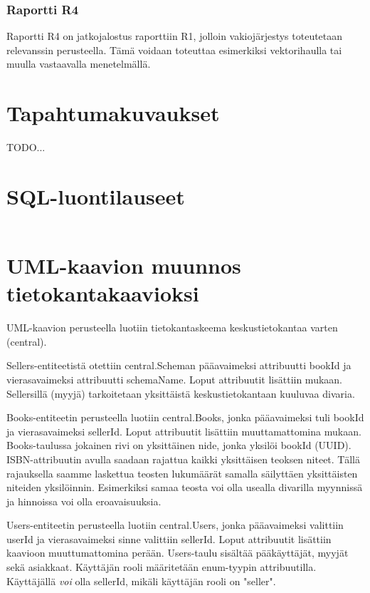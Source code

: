 \documentclass[11pt,a4paper]{article}
\begin{document}
\subsubsection{Raportti R4}

Raportti R4 on jatkojalostus raporttiin R1, jolloin vakiojärjestys toteutetaan relevanssin perusteella. Tämä voidaan toteuttaa esimerkiksi vektorihaulla tai muulla vastaavalla menetelmällä.

\section{Tapahtumakuvaukset}

TODO...

\section{SQL-luontilauseet}
\inputminted{sql}{assets/create.sql}

\section{UML-kaavion muunnos tietokantakaavioksi}

UML-kaavion perusteella luotiin tietokantaskeema keskustietokantaa varten (central).

Sellers-entiteetistä otettiin central.Scheman pääavaimeksi attribuutti bookId ja vierasavaimeksi attribuutti schemaName. Loput attribuutit lisättiin mukaan. Sellersillä (myyjä) tarkoitetaan yksittäistä keskustietokantaan kuuluvaa divaria.

Books-entiteetin perusteella luotiin central.Books, jonka pääavaimeksi tuli bookId ja vierasavaimeksi sellerId. Loput attribuutit lisättiin muuttamattomina mukaan. Books-taulussa jokainen rivi on yksittäinen nide, jonka yksilöi bookId (UUID). ISBN-attribuutin avulla saadaan rajattua kaikki yksittäisen teoksen niteet. Tällä rajauksella saamme laskettua teosten lukumäärät samalla säilyttäen yksittäisten niteiden yksilöinnin. Esimerkiksi samaa teosta voi olla usealla divarilla myynnissä ja hinnoissa voi olla eroavaisuuksia.

Users-entiteetin perusteella luotiin central.Users, jonka pääavaimeksi valittiin userId ja vierasavaimeksi sinne valittiin sellerId. Loput attribuutit lisättiin kaavioon muuttumattomina perään. Users-taulu sisältää pääkäyttäjät, myyjät sekä asiakkaat. Käyttäjän rooli määritetään enum-tyypin attribuutilla. Käyttäjällä \textit{voi} olla sellerId, mikäli käyttäjän rooli on "seller".
\end{document}
